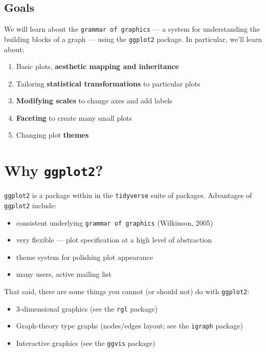 \documentclass[
]{book}
\providecommand{\tightlist}{%
  \setlength{\itemsep}{0pt}\setlength{\parskip}{0pt}}
\begin{document}
\hypertarget{goals-2}{%
\subsection{Goals}\label{goals-2}}

\begin{alert}

We will learn about the \texttt{grammar\ of\ graphics} --- a system for understanding the building blocks of a graph --- using the \texttt{ggplot2} package. In particular, we'll learn about:

\begin{enumerate}
\def\labelenumi{\arabic{enumi}.}
\tightlist
\item
  Basic plots, \textbf{aesthetic mapping and inheritance}
\item
  Tailoring \textbf{statistical transformations} to particular plots
\item
  \textbf{Modifying scales} to change axes and add labels
\item
  \textbf{Faceting} to create many small plots
\item
  Changing plot \textbf{themes}
\end{enumerate}

\end{alert}

\hypertarget{why-ggplot2}{%
\section{\texorpdfstring{Why \texttt{ggplot2}?}{Why ggplot2?}}\label{why-ggplot2}}

\texttt{ggplot2} is a package within in the \texttt{tidyverse} suite of packages. Advantages of \texttt{ggplot2} include:

\begin{itemize}
\tightlist
\item
  consistent underlying \texttt{grammar\ of\ graphics} (Wilkinson, 2005)
\item
  very flexible --- plot specification at a high level of abstraction
\item
  theme system for polishing plot appearance
\item
  many users, active mailing list
\end{itemize}

That said, there are some things you cannot (or should not) do with \texttt{ggplot2}:

\begin{itemize}
\tightlist
\item
  3-dimensional graphics (see the \texttt{rgl} package)
\item
  Graph-theory type graphs (nodes/edges layout; see the \texttt{igraph} package)
\item
  Interactive graphics (see the \texttt{ggvis} package)
\end{itemize}
\end{document}
